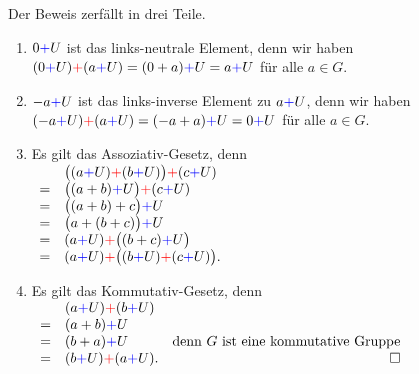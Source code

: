 \proof
Der Beweis zerf\"{a}llt in drei Teile.
\begin{enumerate}
\item $0 {\color{blue}{+}} U$ ist das links-neutrale Element, denn wir haben
      \\[0.2cm]
      \hspace*{1.3cm}
      $(0 {\color{blue}{+}} U) {\color{red}{+}} (a {\color{blue}{+}} U) = (0 + a) {\color{blue}{+}} U = a {\color{blue}{+}} U$ \quad f\"{u}r alle $a \in G$.
\item $-a {\color{blue}{+}} U$ ist das links-inverse Element zu $a {\color{blue}{+}} U$, denn wir haben
      \\[0.2cm]
      \hspace*{1.3cm}
      $(-a {\color{blue}{+}} U) {\color{red}{+}} (a {\color{blue}{+}} U) = (-a + a) {\color{blue}{+}} U = 0 {\color{blue}{+}} U$ \quad f\"{u}r alle $a \in G$.
\item Es gilt das Assoziativ-Gesetz, denn
      \\[0.2cm]
      \hspace*{1.3cm}
      $
      \begin{array}[t]{cl}
        & \bigl((a {\color{blue}{+}} U) {\color{red}{+}} (b {\color{blue}{+}} U)\bigr) {\color{red}{+}} (c {\color{blue}{+}} U)   \\
      = & \bigl((a + b) {\color{blue}{+}} U\bigr) {\color{red}{+}} (c {\color{blue}{+}} U)         \\
      = & \bigl((a + b) + c\bigr) {\color{blue}{+}} U               \\
      = & \bigl(a + (b + c)\bigr) {\color{blue}{+}} U               \\
      = & (a {\color{blue}{+}} U) {\color{red}{+}} \bigl((b + c) {\color{blue}{+}} U\bigr)         \\
      = & (a {\color{blue}{+}} U) {\color{red}{+}} \bigl((b {\color{blue}{+}} U) {\color{red}{+}} (c {\color{blue}{+}} U)\bigr).  \\
      \end{array}
      $
\item Es gilt das Kommutativ-Gesetz, denn
      \\[0.2cm]
      \hspace*{1.3cm}
      $
      \begin{array}[t]{cll}
        & (a {\color{blue}{+}} U) {\color{red}{+}} (b {\color{blue}{+}} U) \\
      = & (a + b) {\color{blue}{+}} U       \\
      = & (b + a) {\color{blue}{+}} U & \mbox{denn $G$ ist eine kommutative Gruppe} \\
      = & (b {\color{blue}{+}} U) {\color{red}{+}} (a {\color{blue}{+}} U). & \hspace*{\fill} \Box
      \end{array}
      $
\end{enumerate}

